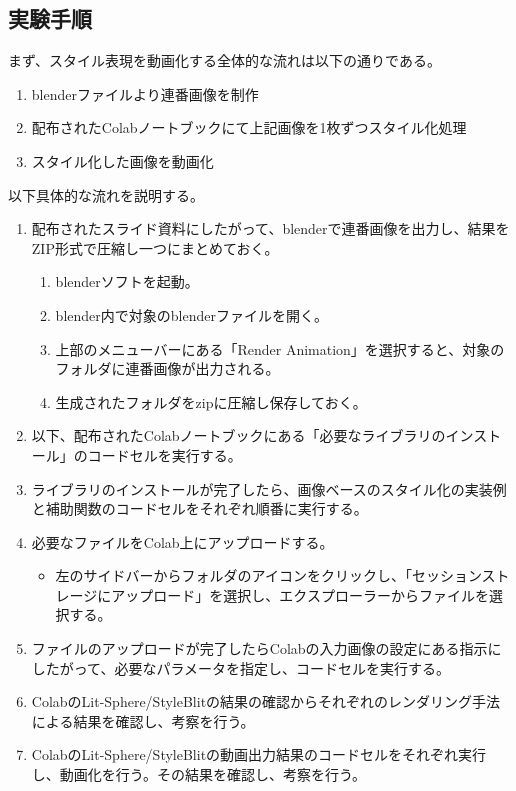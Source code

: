 \documentclass[dvipdfmx]{jsarticle}
\begin{document}
  \subsection{実験手順}
  まず、スタイル表現を動画化する全体的な流れは以下の通りである。
  \begin{enumerate}
    \item blenderファイルより連番画像を制作
    \item 配布されたColabノートブックにて上記画像を1枚ずつスタイル化処理
    \item スタイル化した画像を動画化
  \end{enumerate}
  以下具体的な流れを説明する。
  \begin{enumerate}
    \item 配布されたスライド資料にしたがって、blenderで連番画像を出力し、結果をZIP形式で圧縮し一つにまとめておく。
    \begin{enumerate}
      \item blenderソフトを起動。
      \item blender内で対象のblenderファイルを開く。
      \item 上部のメニューバーにある「Render Animation」を選択すると、対象のフォルダに連番画像が出力される。
      \item 生成されたフォルダをzipに圧縮し保存しておく。
    \end{enumerate}
    \item 以下、配布されたColabノートブックにある「必要なライブラリのインストール」のコードセルを実行する。
    \item ライブラリのインストールが完了したら、画像ベースのスタイル化の実装例と補助関数のコードセルをそれぞれ順番に実行する。
    \item 必要なファイルをColab上にアップロードする。
    \begin{itemize}
      \item 左のサイドバーからフォルダのアイコンをクリックし、「セッションストレージにアップロード」を選択し、エクスプローラーからファイルを選択する。
    \end{itemize}
    \item ファイルのアップロードが完了したらColabの入力画像の設定にある指示にしたがって、必要なパラメータを指定し、コードセルを実行する。
    \item ColabのLit-Sphere/StyleBlitの結果の確認からそれぞれのレンダリング手法による結果を確認し、考察を行う。
    \item ColabのLit-Sphere/StyleBlitの動画出力結果のコードセルをそれぞれ実行し、動画化を行う。その結果を確認し、考察を行う。
  \end{enumerate}
\end{document}
